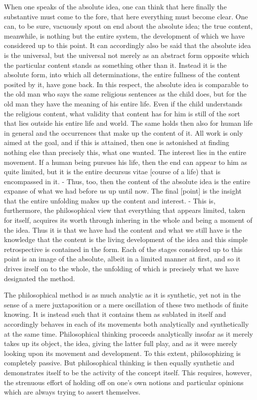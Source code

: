 When one speaks of the absolute idea, one can think that here finally
the substantive must come to the fore, that here everything must become clear.
One can, to be sure, vacuously spout on end about the absolute idea; the true
content, meanwhile, is nothing but the entire system, the development of which
we have considered up to this point. It can accordingly also be said that the absolute
idea is the universal, but the universal not merely as an abstract form opposite
which the particular content stands as something other than it. Instead it is the
absolute form, into which all determinations, the entire fullness of the content
posited by it, have gone back. In this respect, the absolute idea is comparable to
the old man who says the same religious sentences as the child does, but for the
old man they have the meaning of his entire life. Even if the child understands
the religious content, what validity that content has for him is still of the sort that
lies outside his entire life and world. The same holds then also for human life in
general and the occurrences that make up the content of it. All work is only aimed
at the goal, and if this is attained, then one is astonished at finding nothing else
than precisely this, what one wanted. The interest lies in the entire movement. If
a human being pursues his life, then the end can appear to him as quite limited,
but it is the entire decursus vitae [course of a life) that is encompassed in it. - Thus,
too, then the content of the absolute idea is the entire expanse of what we had
before us up until now. The final [point] is the insight that the entire unfolding
makes up the content and interest. - This is, furthermore, the philosophical view
that everything that appears limited, taken for itself, acquires its worth through
inhering in the whole and being a moment of the idea. Thus it is that we have
had the content and what we still have is the knowledge that the content
is the living development of the idea and this simple retrospective is contained
in the form. Each of the stages considered up to this point is an image of the
absolute, albeit in a limited manner at first, and so it drives irself on to the whole,
the unfolding of which is precisely what we have designated the method.

The philosophical method is as much analytic as it is synthetic,
yet not in the sense of a mere juxtaposition or a mere oscillation of
these two methods of finite knowing.
It is instead such that it contains them as sublated in itself
and accordingly behaves in each of its movements
both analytically and synthetically at the same time.
Philosophical thinking proceeds analytically insofar
as it merely takes up its object, the idea, giving the latter full play,
and as it were merely looking upon its movement and development.
To this extent, philosophizing is completely passive.
But philosophical thinking is then equally synthetic and
demonstrates itself to be the activity of the concept itself.
This requires, however, the strenuous effort of holding off on one's own notions
and particular opinions which are always trying to assert themselves.

